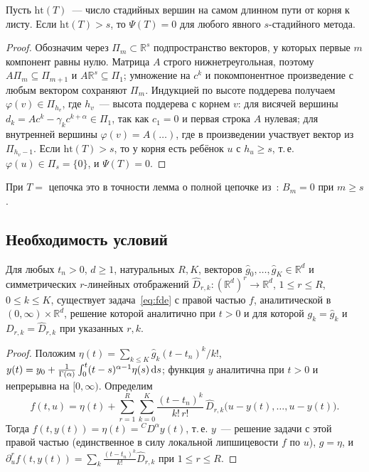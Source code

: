 \begin{corollary}\label{cor:height}
Пусть $\mathrm{ht}(T)$~--- число стадийных вершин на самом длинном пути от корня к листу. Если $\mathrm{ht}(T)>s$, то $\Psi(T)=0$ для любого явного $s$-стадийного метода.
\end{corollary}
\begin{proof}
Обозначим через $\Pi_m\subset\mathbb R^s$ подпространство векторов, у которых первые $m$ компонент равны нулю. Матрица $A$ строго нижнетреугольная, поэтому $A\Pi_m\subseteq\Pi_{m+1}$ и $A\mathbb R^s\subseteq\Pi_1$; умножение на $c^k$ и покомпонентное произведение с любым вектором сохраняют $\Pi_m$. Индукцией по высоте поддерева получаем $\varphi(v)\in\Pi_{h_v}$, где $h_v$~--- высота поддерева с корнем $v$: для висячей вершины $d_k=Ac^k-\gamma_kc^{k+\alpha}\in\Pi_1$, так как $c_1=0$ и первая строка $A$ нулевая; для внутренней вершины $\varphi(v)=A(\dots)$, где в произведении участвует вектор из $\Pi_{h_v-1}$. Если $\mathrm{ht}(T)>s$, то у корня есть ребёнок $u$ с $h_u\ge s$, т.\,е. $\varphi(u)\in\Pi_s=\{0\}$, и $\Psi(T)=0$.
\end{proof}

При $T=$ цепочка это в точности лемма о полной цепочке из~\cite{PrikBarriers}: $B_m=0$ при $m\ge s$.

\subsection{Необходимость условий}

\begin{lemma}\label{lem:free}
Для любых $t_n>0$, $d\ge1$, натуральных $R,K$, векторов $\hat g_0,\dots,\hat g_K\in\mathbb R^d$ и симметрических $r$-линейных отображений $\hat D_{r,k}:(\mathbb R^d)^r\to\mathbb R^d$, $1\le r\le R$, $0\le k\le K$, существует задача~\eqref{eq:fde} с правой частью $f$, аналитической в $(0,\infty)\times\mathbb R^d$, решение которой аналитично при $t>0$ и для которой $g_k=\hat g_k$ и $D_{r,k}=\hat D_{r,k}$ при указанных $r,k$.
\end{lemma}
\begin{proof}
Положим $\eta(t)=\sum_{k\le K}\hat g_k(t-t_n)^k/k!$, $y(t)=y_0+\frac{1}{\Gamma(\alpha)}\int_0^t(t-s)^{\alpha-1}\eta(s)\,\mathrm{d} s$; функция $y$ аналитична при $t>0$ и непрерывна на $[0,\infty)$. Определим
\[
f(t,u)=\eta(t)+\sum_{r=1}^{R}\sum_{k=0}^{K}\frac{(t-t_n)^k}{k!\,r!}\,\hat D_{r,k}\bigl(u-y(t),\dots,u-y(t)\bigr).
\]
Тогда $f(t,y(t))=\eta(t)={}^{C}\!D^{\alpha}y(t)$, т.\,е. $y$~--- решение задачи с этой правой частью (единственное в силу локальной липшицевости $f$ по $u$), $g=\eta$, и $\partial_u^rf(t,y(t))=\sum_k\frac{(t-t_n)^k}{k!}\hat D_{r,k}$ при $1\le r\le R$.
\end{proof}

